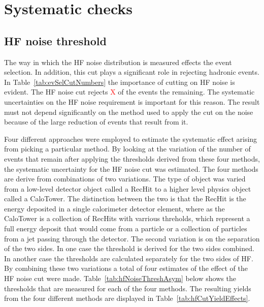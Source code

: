   \section{\label{sec:sysCheck} Systematic checks}
    \subsection{HF noise threshold}
      The way in which the HF noise distribution is measured effects the event 
        selection.
      In addition, this cut plays a significant role in rejecting hadronic 
        events.
      In Table~\ref{tab:evSelCutNumbers} the importance of cutting on HF noise
        is evident. 
      The HF noise cut rejects \textcolor{red}{X} of the events the remaining. 
      The systematic uncertainties on the HF noise requirement is important for
        this reason.
      The result must not depend significantly on the method used to apply the
        cut on the noise because of the large reduction of events that result
        from it. 
      
      Four different approaches were employed to estimate the systematic effect
        arising from picking a particular method. 
      By looking at the variation of the number of events that remain after 
        applying the thresholds derived from these four methods, the systematic
        uncertainty for the HF noise cut was estimated.
      The four methods are derive from combinations of two variations. 
      The type of object was varied from a low-level detector object called a 
        RecHit to a higher level physics object called a CaloTower. 
      The distinction between the two is that the RecHit is the energy 
        deposited in a single calorimeter detector element, where as the 
        CaloTower is a collection of RecHits with varrious threholds, which 
        represent a full energy deposit that would come from a particle or 
        a collection of particles from a jet passing through the detector. 
      The second variation is on the separation of the two sides.
      In one case the threshold is derived for the two sides combined.
      In another case the thresholds are calculated separately for the two 
        sides of HF.
      By combining these two variations a total of four estimates of the effect
        of the HF noise cut were made.
      Table~\ref{tab:hfNoiseThreshAsym} below shows the thresholds that are 
        measured for each of the four methods.
      The resulting yields from the four different methods are displayed in 
        Table~\ref{tab:hfCutYieldEffects}.

